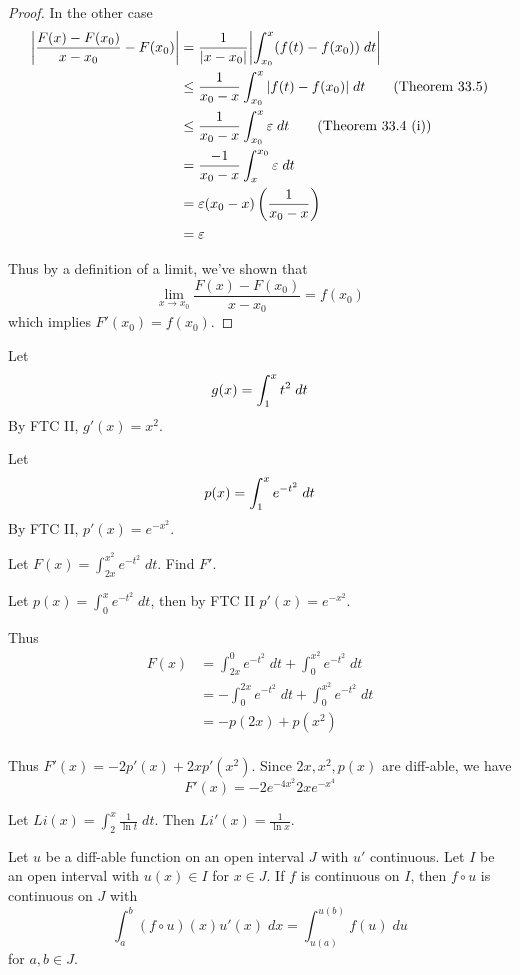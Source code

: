 \documentclass{article}
\begin{document}
\begin{proof}
    In the other case
    \begin{align*}
      \abs{\frac{F(x) - F(x_0)}{x - x_0} - F(x_0)} &= \frac{1}{\abs{x - x_0}} \abs{\int_{x_0}^x (f(t) - f(x_0)) \; dt}\\
      &\leq \frac{1}{x_0 - x} \int_{x_0}^x \abs{f(t) - f(x_0)} \; dt \tag{Theorem 33.5}\\
      &\leq \frac{1}{x_0 - x}\int_{x_0}^x \varepsilon \; dt \tag{Theorem 33.4 (i)}\\
      &= \frac{-1}{x_0 - x}\int_x^{x_0} \varepsilon \; dt\\
      &= \varepsilon (x_0-x)\left(\frac{1}{x_0-x}\right)\\
      &= \varepsilon
    \end{align*}

    Thus by a definition of a limit, we've shown that \[
      \lim_{x \to x_0} \frac{F(x) - F(x_0)}{x - x_0} = f(x_0)
    \] which implies $F'(x_0) = f(x_0)$.
  \end{proof}
  \begin{example}
    Let \[
      g(x) = \int_1^x t^2 \; dt\\
    \]
    By FTC II, $g'(x) = x^2$.
  \end{example}
  \begin{example}
    Let \[
      p(x) = \int_1^x e^{-t^2} \; dt\\
    \]
    By FTC II, $p'(x) = e^{-x^2}$.
  \end{example}
  \begin{example}
    Let $F(x) = \int_{2x}^{x^2} e^{-t^2} \; dt$. Find $F'$.

    Let $p(x) = \int_0^x e^{-t^2} \; dt$, then by FTC II $p'(x) = e^{-x^2}$.

    Thus
    \begin{align*}
      F(x) &= \int_{2x}^0 e^{-t^2} \; dt + \int_0^{x^2} e^{-t^2} \; dt\\
      &= -\int_0^{2x} e^{-t^2} \; dt + \int_0^{x^2} e^{-t^2} \; dt\\
      &= -p(2x) + p(x^2)\\
    \end{align*}

    Thus $F'(x) = -2p'(x) + 2xp'(x^2)$. Since $2x, x^2, p(x)$ are diff-able, we have \[
      F'(x) = -2e^{-4x^2} 2xe^{-x^4}
    \]
  \end{example}
  \begin{example}
    Let $Li(x) = \int_2^x \frac{1}{\ln t} \; dt$. Then $Li'(x) = \frac{1}{\ln x}$.
  \end{example}
  \begin{cthm}
    Let $u$ be a diff-able function on an open interval $J$ with $u'$ continuous. Let $I$ be an open interval with $u(x) \in I$ for $x \in J$. If $f$ is continuous on $I$, then $f \circ u$ is continuous on $J$ with \[
      \int_a^b (f \circ u)(x) u'(x) \; dx = \int_{u(a)}^{u(b)} f(u) \; du
    \] for $a, b \in J$.
  \end{cthm}
\end{document}
